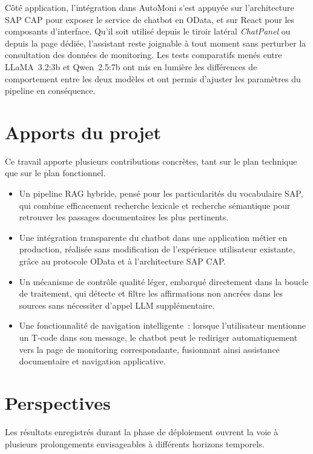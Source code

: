 Côté application, l'intégration dans AutoMoni s'est appuyée sur l'architecture SAP CAP pour exposer le service de chatbot en OData, et sur React pour les composants d'interface. Qu'il soit utilisé depuis le tiroir latéral \textit{ChatPanel} ou depuis la page dédiée, l'assistant reste joignable à tout moment sans perturber la consultation des données de monitoring. Les tests comparatifs menés entre LLaMA~3.2:3b et Qwen~2.5:7b ont mis en lumière les différences de comportement entre les deux modèles et ont permis d'ajuster les paramètres du pipeline en conséquence.

\section*{Apports du projet}

Ce travail apporte plusieurs contributions concrètes, tant sur le plan technique que sur le plan fonctionnel.

\begin{itemize}[leftmargin=2em]
  \item Un pipeline RAG hybride, pensé pour les particularités du vocabulaire SAP, qui combine efficacement recherche lexicale et recherche sémantique pour retrouver les passages documentaires les plus pertinents.
  \item Une intégration transparente du chatbot dans une application métier en production, réalisée sans modification de l'expérience utilisateur existante, grâce au protocole OData et à l'architecture SAP CAP.
  \item Un mécanisme de contrôle qualité léger, embarqué directement dans la boucle de traitement, qui détecte et filtre les affirmations non ancrées dans les sources sans nécessiter d'appel LLM supplémentaire.
  \item Une fonctionnalité de navigation intelligente~: lorsque l'utilisateur mentionne un T-code dans son message, le chatbot peut le rediriger automatiquement vers la page de monitoring correspondante, fusionnant ainsi assistance documentaire et navigation applicative.
\end{itemize}

\section*{Perspectives}

Les résultats enregistrés durant la phase de déploiement ouvrent la voie à plusieurs prolongements envisageables à différents horizons temporels.


